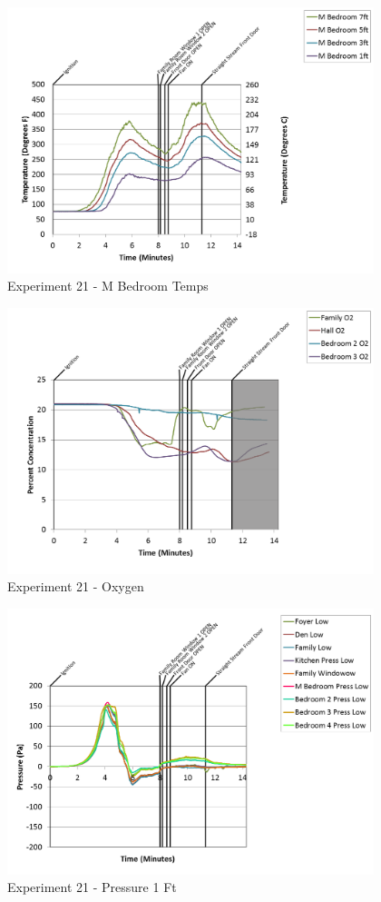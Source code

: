 \documentclass{article}
\begin{document}
\begin{appendices}
\begin{figure}[h!]
	\centering
	\includegraphics[height=3.05in]{0_Images/Results_Charts/Exp_21_Charts/MBedroomTemps.png}
	\caption{Experiment 21 - M Bedroom Temps}
\end{figure}

\clearpage

\begin{figure}[h!]
	\centering
	\includegraphics[height=3.05in]{0_Images/Results_Charts/Exp_21_Charts/Oxygen.png}
	\caption{Experiment 21 - Oxygen}
\end{figure}


\begin{figure}[h!]
	\centering
	\includegraphics[height=3.05in]{0_Images/Results_Charts/Exp_21_Charts/Pressure1Ft.png}
	\caption{Experiment 21 - Pressure 1 Ft}
\end{figure}


\end{appendices}
\end{document}
